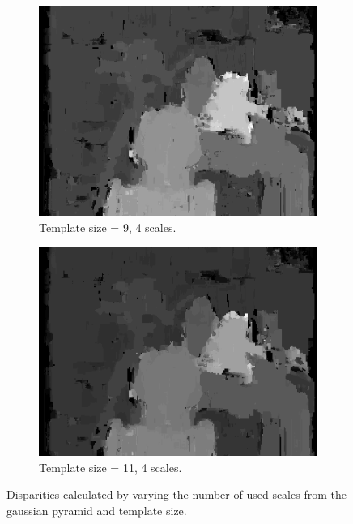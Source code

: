 \documentclass[12pt,a4paper,oneside,final]{article}
\begin{document}
\begin{figure}[H]
\begin{subfigure}[b]{0.24\textwidth}
			\includegraphics[width=\textwidth]{disparity_s4_k9set_1.png}
			\caption{Template size = 9, 4 scales.}
		\end{subfigure}
		\begin{subfigure}[b]{0.24\textwidth}
			\includegraphics[width=\textwidth]{disparity_s4_k11set_1.png}
			\caption{Template size = 11, 4 scales.}
		\end{subfigure}
		\caption{Disparities calculated by varying the number of used scales from the gaussian pyramid and template size.}
		\label{fig:disparities}
	\end{figure}
	
\end{document}
